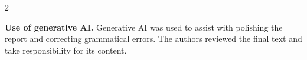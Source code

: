 \begin{multicols}{2}
\smallskip
{\footnotesize
\noindent\textbf{Use of generative AI.} Generative AI was used to assist with polishing the report and correcting grammatical errors. The authors reviewed the final text and take responsibility for its content.\par}
\end{multicols}

\clearpage
\onecolumn
